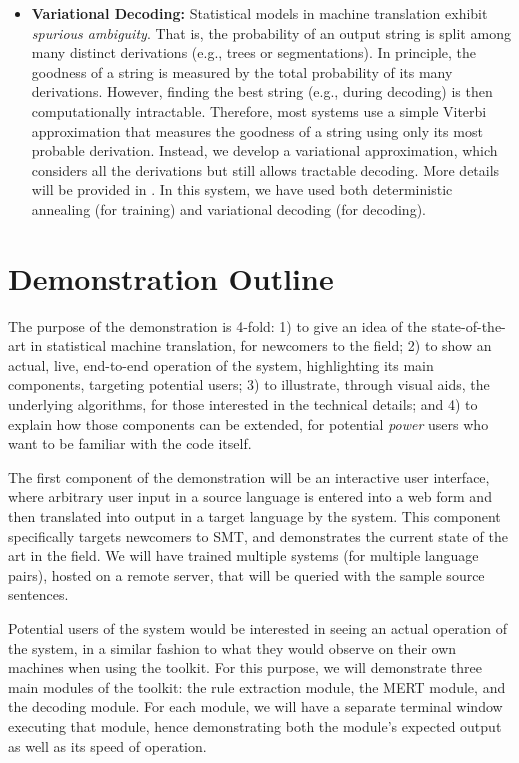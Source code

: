 \documentclass[11pt]{article}
\begin{document}
\begin{itemize}
\item \textbf{Variational Decoding: }
Statistical models in machine translation exhibit \emph{spurious ambiguity}.  That is, the probability of an output string is split among many distinct derivations (e.g., trees or segmentations).  In principle, the goodness of a string is measured by the total probability of its many derivations.  However, finding the best string (e.g., during decoding) is then computationally intractable. Therefore, most systems use a simple Viterbi approximation that measures the goodness of a string using only its most probable derivation.  Instead, we develop a variational approximation, which considers all the derivations but still allows tractable decoding.  More details will be provided in . In this system, we have used both deterministic annealing (for training) and variational decoding (for decoding).
\end{itemize}

\section{Demonstration Outline}

The purpose of the demonstration is 4-fold: 1) to give an idea of the state-of-the-art in statistical machine translation, for newcomers to the field; 2) to show an actual, live, end-to-end operation of the system, highlighting its main components, targeting potential users; 3) to illustrate, through visual aids, the underlying algorithms, for those interested in the technical details; and 4) to explain how those components can be extended, for potential \emph{power} users who want to be familiar with the code itself.

The first component of the demonstration will be an interactive user interface, where arbitrary user input in a source language is entered into a web form and then translated into output in a target language by the system. This component specifically targets newcomers to SMT, and demonstrates the current state of the art in the field. We will have trained multiple systems (for multiple language pairs), hosted on a remote server, that will be queried with the sample source sentences.

Potential users of the system would be interested in seeing an actual operation of the system, in a similar fashion to what they would observe on their own machines when using the toolkit. For this purpose, we will demonstrate three main modules of the toolkit: the rule extraction module, the MERT module, and the decoding module. For each module, we will have a separate terminal window executing that module, hence demonstrating both the module's expected output as well as its speed of operation.
\end{document}
